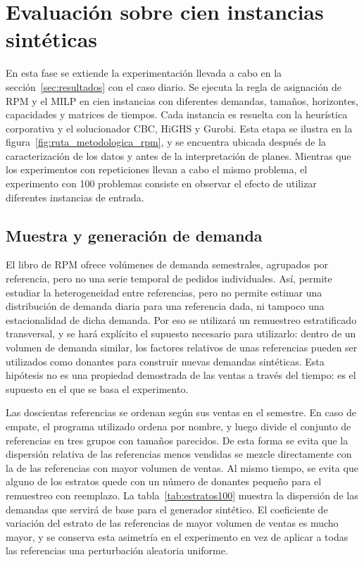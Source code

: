 \section{Evaluación sobre cien instancias sintéticas}\label{sec:instancias}
En esta fase se extiende la experimentación llevada a cabo en la sección~\ref{sec:resultados} con el caso diario. Se ejecuta la regla de asignación de RPM y el MILP en cien instancias con diferentes demandas, tamaños, horizontes, capacidades y matrices de tiempos. Cada instancia es resuelta con la heurística corporativa y el solucionador CBC, HiGHS y Gurobi. Esta etapa se ilustra en la figura~\ref{fig:ruta_metodologica_rpm}, y se encuentra ubicada después de la caracterización de los datos y antes de la interpretación de planes. Mientras que los experimentos con repeticiones llevan a cabo el mismo problema, el experimento con 100 problemas consiste en observar el efecto de utilizar diferentes instancias de entrada.

\subsection{Muestra y generación de demanda}\label{sec:muestreo100}
El libro de RPM ofrece volúmenes de demanda semestrales, agrupados por referencia, pero no una serie temporal de pedidos individuales. Así, permite estudiar la heterogeneidad entre referencias, pero no permite estimar una distribución de demanda diaria para una referencia dada, ni tampoco una estacionalidad de dicha demanda. Por eso se utilizará un remuestreo estratificado transversal, y se hará explícito el supuesto necesario para utilizarlo: dentro de un volumen de demanda similar, los factores relativos de unas referencias pueden ser utilizados como donantes para construir nuevas demandas sintéticas. Esta hipótesis no es una propiedad demostrada de las ventas a través del tiempo: es el supuesto en el que se basa el experimento.

Las doscientas referencias se ordenan según sus ventas en el semestre. En caso de empate, el programa utilizado ordena por nombre, y luego divide el conjunto de referencias en tres grupos con tamaños parecidos. De esta forma se evita que la dispersión relativa de las referencias menos vendidas se mezcle directamente con la de las referencias con mayor volumen de ventas. Al mismo tiempo, se evita que alguno de los estratos quede con un número de donantes pequeño para el remuestreo con reemplazo. La tabla~\ref{tab:estratos100} muestra la dispersión de las demandas que servirá de base para el generador sintético. El coeficiente de variación del estrato de las referencias de mayor volumen de ventas es mucho mayor, y se conserva esta asimetría en el experimento en vez de aplicar a todas las referencias una perturbación aleatoria uniforme.

